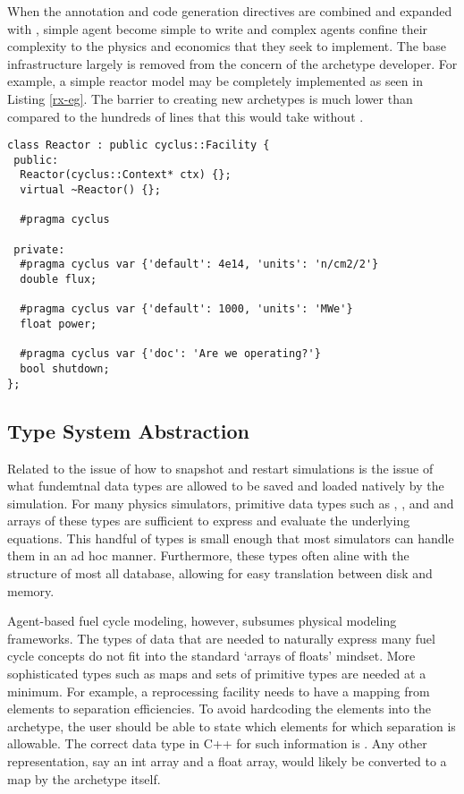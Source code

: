 When the annotation and code generation directives are combined and expanded with 
\cycpp, simple agent become simple to write and complex agents confine their 
complexity to the physics and economics that they seek to implement. The base \cyclus
infrastructure largely is removed from the concern of the archetype developer.
For example, a simple reactor model may be completely implemented as seen in 
Listing \ref{rx-eg}. The barrier to creating new archetypes is much lower than 
compared to the hundreds of lines that this would take without \cycpp.

\begin{lstlisting}[caption={Simple Reactor Archetype}, label=rx-eg]
class Reactor : public cyclus::Facility {
 public:
  Reactor(cyclus::Context* ctx) {};
  virtual ~Reactor() {};

  #pragma cyclus

 private:
  #pragma cyclus var {'default': 4e14, 'units': 'n/cm2/2'}
  double flux;

  #pragma cyclus var {'default': 1000, 'units': 'MWe'}
  float power;

  #pragma cyclus var {'doc': 'Are we operating?'}
  bool shutdown;
};
\end{lstlisting}

\subsection{Type System Abstraction}

Related to the issue of how to snapshot and restart simulations is the issue of 
what fundemtnal data types are allowed to be saved and loaded natively by the 
simulation. For many physics simulators, primitive data types such as , 
, and  and arrays of these types are sufficient to 
express and evaluate the underlying equations. This handful of types is small enough 
that most simulators can handle them in an ad hoc manner. Furthermore, these types
often aline with the structure of most all database, allowing for easy translation
between disk and memory.

Agent-based fuel cycle modeling, however, subsumes physical modeling frameworks.
The types of data that are needed to naturally express many fuel cycle concepts 
do not fit into the standard `arrays of floats' mindset.  More sophisticated types
such as maps and sets of primitive types are needed at a minimum. For example, 
a reprocessing facility needs to have a mapping from elements to separation 
efficiencies. To avoid hardcoding the elements into the archetype, the user should 
be able to state which elements for which separation is allowable. The correct data
type in C++ for such information is . Any other 
representation, say an int array and a float array,  would likely be converted to 
a map by the archetype itself.

